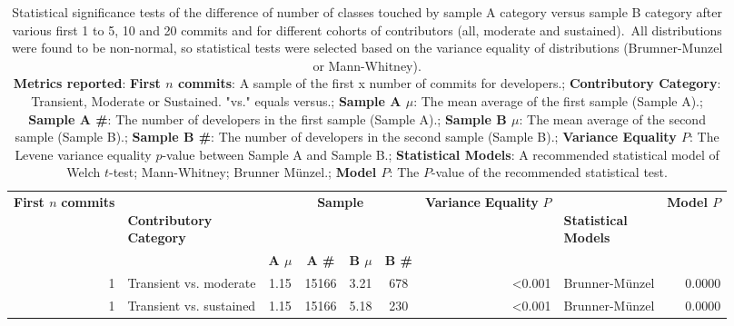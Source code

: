 \begin{table}[H]
\centering
\setlength{\tabcolsep}{2pt}
\caption[Statistical Significance Normality and Variance tests for classes for  sample A category versus sample B category  for 1 to 5, 10 and 20]{Statistical significance tests of the difference of number of classes touched by  sample A category versus sample B category  after various first 1 to 5, 10 and 20 commits and for different cohorts of contributors (all, moderate and sustained). All distributions were found to be non-normal, so statistical tests were selected based on the variance equality of distributions (Brumner-Munzel or Mann-Whitney). \\ \textbf{Metrics reported}:   \textbf{First $n$ commits}: A sample of the first x number of commits for developers.;  \textbf{Contributory Category}: Transient, Moderate or Sustained. "vs." equals versus.;  \textbf{Sample A $\mu$}: The mean average of the first sample (Sample A).;  \textbf{Sample A \#}: The number of developers in the first sample (Sample A).;  \textbf{Sample B $\mu$}: The mean average of the second sample (Sample B).;  \textbf{Sample B \#}: The number of developers in the second sample (Sample B).;  \textbf{Variance Equality $P$}: The Levene variance equality $p$-value between Sample A and Sample B.;  \textbf{Statistical Models}: A recommended statistical model of Welch $t$-test; Mann-Whitney; Brunner Münzel.;  \textbf{Model $P$}: The $P$-value of the recommended statistical test.
}
\begin{tabular}{r p{4cm} c c c c r l r}
\toprule
\makecell[t]{\textbf{First $n$}\\\textbf{commits}} & \makecell[t]{\textbf{}\\\textbf{Contributory}\\\textbf{Category}} & \multicolumn{4}{c}{\textbf{Sample}} & \makecell[t]{\textbf{Variance}\\\textbf{Equality}\\\textbf{$P$}} & \makecell[t]{\textbf{}\\\textbf{Statistical}\\\textbf{Models}} & \textbf{Model $P$} \\ 
\cmidrule(lr){3-6}
 &  & \textbf{A $\mu$} & \textbf{A \#} & \textbf{B $\mu$} & \textbf{B \#} &  &  &  \\ 
\midrule
1 & Transient vs. moderate &  1.15 & 15166 & 3.21 & 678 & \textless 0.001 &  Brunner-Münzel & 0.0000 \\ 
1 & Transient vs. sustained &  1.15 & 15166 & 5.18 & 230 & \textless 0.001 &  Brunner-Münzel & 0.0000 \\ 

\end{tabular}
\end{table}
